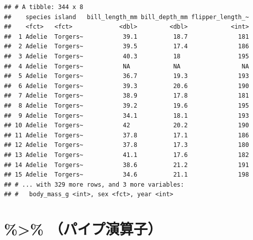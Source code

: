 \documentclass[
  xelatex,ja=standard, b5paper]{bxjsbook}
\begin{document}
\begin{verbatim}
## # A tibble: 344 x 8
##    species island   bill_length_mm bill_depth_mm flipper_length_~
##    <fct>   <fct>             <dbl>         <dbl>            <int>
##  1 Adelie  Torgers~           39.1          18.7              181
##  2 Adelie  Torgers~           39.5          17.4              186
##  3 Adelie  Torgers~           40.3          18                195
##  4 Adelie  Torgers~           NA            NA                 NA
##  5 Adelie  Torgers~           36.7          19.3              193
##  6 Adelie  Torgers~           39.3          20.6              190
##  7 Adelie  Torgers~           38.9          17.8              181
##  8 Adelie  Torgers~           39.2          19.6              195
##  9 Adelie  Torgers~           34.1          18.1              193
## 10 Adelie  Torgers~           42            20.2              190
## 11 Adelie  Torgers~           37.8          17.1              186
## 12 Adelie  Torgers~           37.8          17.3              180
## 13 Adelie  Torgers~           41.1          17.6              182
## 14 Adelie  Torgers~           38.6          21.2              191
## 15 Adelie  Torgers~           34.6          21.1              198
## # ... with 329 more rows, and 3 more variables:
## #   body_mass_g <int>, sex <fct>, year <int>
\end{verbatim}

\hypertarget{p-pipe}{%
\section{\%\textgreater\% （パイプ演算子）}\label{p-pipe}}
\end{document}
